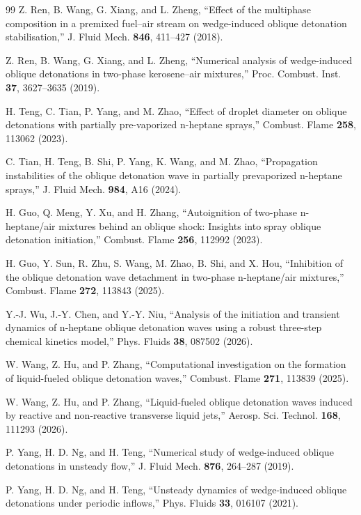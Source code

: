 \documentclass[aip,pof,preprint,amsmath,amssymb]{revtex4-2}
\begin{document}
\begin{thebibliography}{99}
 Z. Ren, B. Wang, G. Xiang, and L. Zheng, ``Effect of the multiphase composition in a premixed fuel--air stream on wedge-induced oblique detonation stabilisation,'' J. Fluid Mech. \textbf{846}, 411--427 (2018).

 Z. Ren, B. Wang, G. Xiang, and L. Zheng, ``Numerical analysis of wedge-induced oblique detonations in two-phase kerosene--air mixtures,'' Proc. Combust. Inst. \textbf{37}, 3627--3635 (2019).

 H. Teng, C. Tian, P. Yang, and M. Zhao, ``Effect of droplet diameter on oblique detonations with partially pre-vaporized n-heptane sprays,'' Combust. Flame \textbf{258}, 113062 (2023).

 C. Tian, H. Teng, B. Shi, P. Yang, K. Wang, and M. Zhao, ``Propagation instabilities of the oblique detonation wave in partially prevaporized n-heptane sprays,'' J. Fluid Mech. \textbf{984}, A16 (2024).

 H. Guo, Q. Meng, Y. Xu, and H. Zhang, ``Autoignition of two-phase n-heptane/air mixtures behind an oblique shock: Insights into spray oblique detonation initiation,'' Combust. Flame \textbf{256}, 112992 (2023).

 H. Guo, Y. Sun, R. Zhu, S. Wang, M. Zhao, B. Shi, and X. Hou, ``Inhibition of the oblique detonation wave detachment in two-phase n-heptane/air mixtures,'' Combust. Flame \textbf{272}, 113843 (2025).

 Y.-J. Wu, J.-Y. Chen, and Y.-Y. Niu, ``Analysis of the initiation and transient dynamics of n-heptane oblique detonation waves using a robust three-step chemical kinetics model,'' Phys. Fluids \textbf{38}, 087502 (2026).

 W. Wang, Z. Hu, and P. Zhang, ``Computational investigation on the formation of liquid-fueled oblique detonation waves,'' Combust. Flame \textbf{271}, 113839 (2025).

 W. Wang, Z. Hu, and P. Zhang, ``Liquid-fueled oblique detonation waves induced by reactive and non-reactive transverse liquid jets,'' Aerosp. Sci. Technol. \textbf{168}, 111293 (2026).

 P. Yang, H. D. Ng, and H. Teng, ``Numerical study of wedge-induced oblique detonations in unsteady flow,'' J. Fluid Mech. \textbf{876}, 264--287 (2019).

 P. Yang, H. D. Ng, and H. Teng, ``Unsteady dynamics of wedge-induced oblique detonations under periodic inflows,'' Phys. Fluids \textbf{33}, 016107 (2021).


\end{thebibliography}
\end{document}
